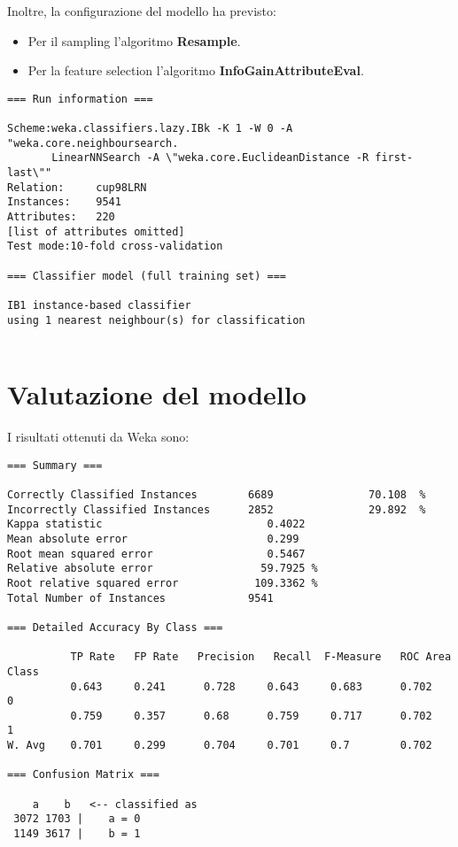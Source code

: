 Inoltre, la configurazione del modello ha previsto:
\begin{itemize}
\item Per il sampling l'algoritmo \textbf{Resample}.
\item Per la feature selection l'algoritmo \textbf{InfoGainAttributeEval}.
\end{itemize}

\begin{verbatim}
=== Run information ===

Scheme:weka.classifiers.lazy.IBk -K 1 -W 0 -A "weka.core.neighboursearch.
       LinearNNSearch -A \"weka.core.EuclideanDistance -R first-last\""
Relation:     cup98LRN
Instances:    9541
Attributes:   220
[list of attributes omitted]
Test mode:10-fold cross-validation

=== Classifier model (full training set) ===

IB1 instance-based classifier
using 1 nearest neighbour(s) for classification


\end{verbatim}

\section{Valutazione del modello}

I risultati ottenuti da Weka sono:

\begin{verbatim}
=== Summary ===

Correctly Classified Instances        6689               70.108  %
Incorrectly Classified Instances      2852               29.892  %
Kappa statistic                          0.4022
Mean absolute error                      0.299 
Root mean squared error                  0.5467
Relative absolute error                 59.7925 %
Root relative squared error            109.3362 %
Total Number of Instances             9541     

=== Detailed Accuracy By Class ===

          TP Rate   FP Rate   Precision   Recall  F-Measure   ROC Area  Class
          0.643     0.241      0.728     0.643     0.683      0.702    0
          0.759     0.357      0.68      0.759     0.717      0.702    1
W. Avg    0.701     0.299      0.704     0.701     0.7        0.702

=== Confusion Matrix ===

    a    b   <-- classified as
 3072 1703 |    a = 0
 1149 3617 |    b = 1
\end{verbatim}